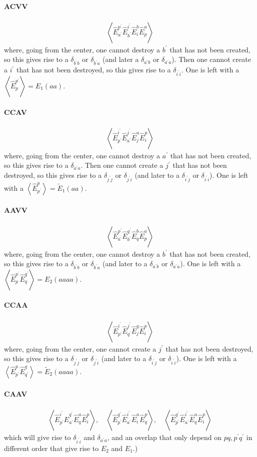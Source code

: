 \documentclass{article}
\newcommand  \equ[2]       {\begin{align}#2\label{#1}\end{align}}
\newcommand  \Expect[1]    {\left\langle  #1 \right\rangle}
\newcommand  \E[2]         {\hat{E}_{#1}^{#2}}
\renewcommand\P            {^\prime}
\begin{document}
\paragraph{ACVV}
\equ{ }{
  \Expect{ \E{a\P}{p\P}\E{b\P}{i\P}\E{i}{b}\E{p}{a}}
}
where, going from the center, one cannot destroy a $b\P$ that has not been created, so this gives rise to a $\delta_{b\P b}$ or $\delta_{b\P a}$ (and later a $\delta_{a\P b}$ or $\delta_{a\P a}$).
Then one cannot create a $i\P$ that has not been destroyed, so this gives rise to a $\delta_{i\P i}$. 
One is left with a $\Expect{\E{p}{p\P}}=E_1(aa)$.

\paragraph{CCAV}
\equ{ }{
  \Expect{ \E{p\P}{i\P}\E{a\P}{j\P}\E{j}{a}\E{i}{p}}
}
where, going from the center, one cannot destroy a $a\P$ that has not been created, so this gives rise to a $\delta_{a\P a}$.
Then one cannot create a $j\P$ that has not been destroyed, so this gives rise to a $\delta_{j\P j}$ or $\delta_{j\P i}$ (and later to a $\delta_{i\P j}$ or $\delta_{i\P i}$).
One is left with a $\Expect{\E{p\P}{p}}=\tilde{E}_1(aa)$.

\paragraph{AAVV}
\equ{ }{
  \Expect{ \E{a\P}{p\P}\E{b\P}{q\P}\E{q}{b}\E{p}{a}}
}
where, going from the center, one cannot destroy a $b\P$ that has not been created, so this gives rise to a $\delta_{b\P b}$ or $\delta_{b\P a}$ (and later to a $\delta_{a\P b}$ or $\delta_{a\P a}$).
One is left with a $\Expect{\E{p}{p\P}\E{q}{q\P}}=E_2(aaaa)$.

\paragraph{CCAA}
\equ{ }{
  \Expect{ \E{p\P}{i\P}\E{q\P}{j\P}\E{j}{q}\E{i}{p}}
}
where, going from the center, one cannot create a $j\P$ that has not been destroyed, so this gives rise to a $\delta_{j\P j}$ or $\delta_{j\P i}$ (and later to a $\delta_{i\P j}$ or $\delta_{i\P i}$).
One is left with a $\Expect{\E{p\P}{p}\E{q\P}{q}}=\tilde{E}_2(aaaa)$.

\paragraph{CAAV}
\equ{ }{
  \Expect{ \E{p\P}{i\P}\E{a\P}{q\P}\E{q}{a}\E{i}{p} }
  ,\quad
  \Expect{ \E{p\P}{q\P}\E{a\P}{i\P}\E{i}{a}\E{q}{p} }
  ,\quad
  \Expect{ \E{p\P}{q\P}\E{a\P}{i\P}\E{q}{a}\E{i}{p} }
}
which will give rise to $\delta_{i\P i}$ and $\delta_{a\P a}$, and an overlap that only depend on $pq,p\P q\P$ in different order that give rise to $E_2$ and $E_1$.)
\end{document}

